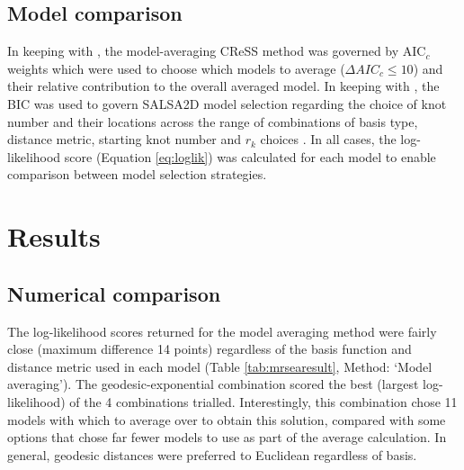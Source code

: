 \documentclass[letterpaper]{interact}
\begin{document}
\subsection{Model comparison}\label{model-comparison}

In keeping with \citet{scott2017}, the model-averaging CReSS method was governed by AIC\(_c\) weights which were used to choose which models to average (\(\Delta AIC_c \leq10\)) and their relative contribution to the overall averaged model. In keeping with \citet{Walk2010}, the BIC was used to govern SALSA2D model selection regarding the choice of knot number and their locations across the range of combinations of basis type, distance metric, starting knot number and \(r_k\) choices \cite{schwarz1978}.  In all cases, the log-likelihood score (Equation \ref{eq:loglik}) was calculated for each model to enable comparison between model selection strategies. 








\section{Results}\label{results}


\subsection{Numerical comparison}\label{numerical-comparison}

The log-likelihood scores returned for the model averaging method were fairly close (maximum difference 14 points) regardless of the basis function and distance metric used in each model (Table \ref{tab:mrsearesult}, Method: `Model averaging'). The geodesic-exponential combination scored the best (largest log-likelihood) of the 4 combinations trialled. Interestingly, this combination chose 11 models with which to average over to obtain this solution, compared with some options that chose far fewer models to use as part of the average calculation. In general, geodesic distances were preferred to Euclidean regardless of basis. 
\end{document}
